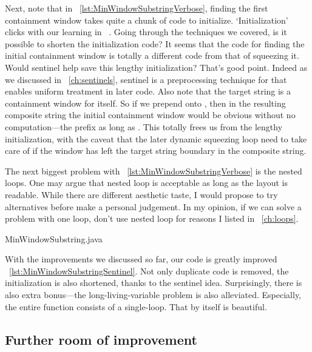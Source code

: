 Next, note that in ~\autoref{lst:MinWindowSubstringVerbose}, finding the first containment
window takes quite a chunk of code to initialize.
`Initialization' clicks with our learning in ~.
Going through the techniques we covered, is it possible to shorten the initialization code?
It seems that the code for finding the initial containment window is totally a different code
from that of squeezing it.
Would sentinel help save this lengthy initialization?
That's good point.
Indeed as we discussed in ~\autoref{ch:sentinels}, sentinel is a preprocessing technique for
that enables uniform treatment in later code.
Also note that the target string is a containment window for itself.
So if we prepend  onto , then in the resulting composite string the initial
containment window would be obvious without no computation---the prefix as long as .
This totally frees us from the lengthy initialization, with the caveat that the later dynamic
squeezing loop need to take care of if the window has left the target string boundary in the
composite string.

The next biggest problem with ~\autoref{lst:MinWindowSubstringVerbose} is the nested loops.
One may argue that nested loop is acceptable as long as the layout is readable.
While there are different aesthetic taste, I would propose to try alternatives before make a
personal judgement.
In my opinion, if we can solve a problem with one loop, don't use nested loop for reasons I
listed in ~\autoref{ch:loops}.


{MinWindowSubstring.java}

With the improvements we discussed so far, our code is greatly improved
~\autoref{lst:MinWindowSubstringSentinel}.
Not only duplicate code is removed, the initialization is also shortened, thanks to
the sentinel idea.
Surprisingly, there is also extra bonus---the long-living-variable problem is also alleviated.
Especially, the entire function consists of a single-loop.
That by itself is beautiful.

\subsection{Further room of improvement}


